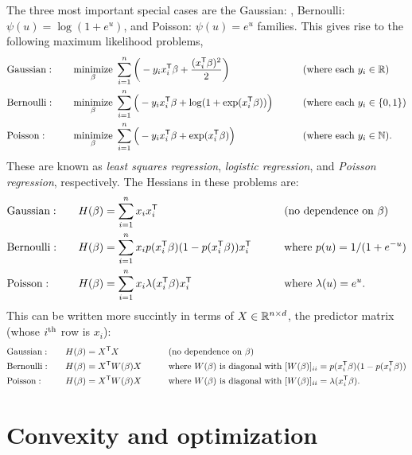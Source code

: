 \documentclass{article}
\begin{document}
The three most important special cases are the Gaussian: , Bernoulli: $\psi(u) = \log(1+e^u)$, and Poisson: $\psi(u) =
e^u$ families. This gives rise to the following maximum likelihood problems,
\begin{alignat*}{5}
&\text{Gaussian}: \quad 
&&\mathop{\mathrm{minimize}}_\beta \; \sum_{i=1}^n \bigg(-y_i x_i^{\mathsf{T}} \beta + 
\frac{(x_i^{\mathsf{T}} \beta)^2}{2} \bigg) \qquad 
&&\text{(where each $y_i \in \mathbb{R}$)} \\
&\text{Bernoulli}: \quad 
&&\mathop{\mathrm{minimize}}_\beta \; \sum_{i=1}^n \Big( -y_i x_i^{\mathsf{T}} \beta + 
\log(1 + \exp(x_i^{\mathsf{T}} \beta)) \Big) \qquad
&&\text{(where each $y_i \in \{0,1\}$)} \\
&\text{Poisson}: \quad
&&\mathop{\mathrm{minimize}}_\beta \; \sum_{i=1}^n \Big( -y_i x_i^{\mathsf{T}} \beta + 
\exp(x_i^{\mathsf{T}} \beta) \Big) \qquad
&&\text{(where each $y_i \in \mathbb{N}$)}. 
\end{alignat*}
These are known as \emph{least squares regression}, \emph{logistic regression},
and \emph{Poisson regression}, respectively. The Hessians in these problems are:  
\begin{alignat*}{5}
&\text{Gaussian}: \quad
&&H(\beta) = \sum_{i=1}^n x_i x_i^{\mathsf{T}} \qquad
&& \text{(no dependence on $\beta$)} \\
&\text{Bernoulli}: \quad 
&&H(\beta) = \sum_{i=1}^n x_i p(x_i^{\mathsf{T}} \beta) (1 - p(x_i^{\mathsf{T}} \beta)) x_i^{\mathsf{T}} 
\qquad    
&&\text{where $p(u) = 1/(1+e^{-u})$} \\
&\text{Poisson}: \quad
&&H(\beta) = \sum_{i=1}^n x_i \lambda(x_i^{\mathsf{T}} \beta) x_i^{\mathsf{T}} \qquad
&&\text{where $\lambda(u) = e^u$}.
\end{alignat*}
This can be written more succintly in terms of $X \in \mathbb{R}^{n \times d}$, the
predictor matrix (whose $i^{\text{th}}$ row is $x_i$): 
\begin{alignat*}{5}
&\text{Gaussian}: \quad
&&H(\beta) =X^{\mathsf{T}} X \qquad
&& \text{(no dependence on $\beta$)} \\
&\text{Bernoulli}: \quad 
&&H(\beta) = X^{\mathsf{T}} W(\beta) X \qquad    
&&\text{where $W(\beta)$ is diagonal with $[W(\beta)]_{ii} = p(x_i^{\mathsf{T}} \beta)
  (1 - p(x_i^{\mathsf{T}} \beta))$} \\
&\text{Poisson}: \quad
&&H(\beta) = X^{\mathsf{T}} W(\beta) X \qquad
&&\text{where $W(\beta)$ is diagonal with $[W(\beta)]_{ii} = \lambda(x_i^{\mathsf{T}}
  \beta)$}. 
\end{alignat*}

\section{Convexity and optimization}
\end{document}
